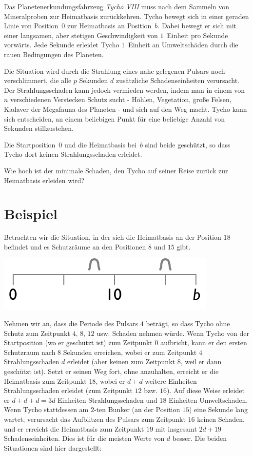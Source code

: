 

\noindent
Das Planetenerkundungsfahrzeug \emph{Tycho VIII} muss nach dem Sammeln von Mineralproben zur Heimatbasis zurückkehren.
Tycho bewegt sich in einer geraden Linie von Position~$0$ zur Heimatbasis an Position~$b$.
Dabei bewegt er sich mit einer langsamen, aber stetigen Geschwindigkeit von $1$~Einheit pro Sekunde vorwärts.
Jede Sekunde erleidet Tycho $1$~Einheit an Umweltschäden durch die rauen Bedingungen des Planeten.

Die Situation wird durch die Strahlung eines nahe gelegenen Pulsars noch verschlimmert, die alle $p$ Sekunden $d$ zusätzliche Schadenseinheiten verursacht.
Der Strahlungsschaden kann jedoch vermieden werden, indem man in einem von $n$ verschiedenen Verstecken Schutz sucht - Höhlen, Vegetation, große Felsen, Kadaver der Megafauna des Planeten - und sich auf den Weg macht.
Tycho kann sich entscheiden, an einem beliebigen Punkt für eine beliebige Anzahl von Sekunden stillzustehen.

Die Startposition~$0$ und die Heimatbasis bei~$b$ sind beide geschützt, so dass Tycho dort keinen Strahlungsschaden erleidet.

\medskip
Wie hoch ist der minimale Schaden, den Tycho auf seiner Reise zurück zur Heimatbasis erleiden wird?

\section*{Beispiel}

Betrachten wir die Situation, in der sich die Heimatbasis an der Position $18$ befindet und es Schutzräume an den Positionen $8$ und $15$ gibt.

\includegraphics[width=.3\textwidth]{img/samplesetup}

Nehmen wir an, dass die Periode des Pulsars $4$ beträgt, so dass Tycho ohne Schutz zum Zeitpunkt $4$, $8$, $12$ usw. Schaden nehmen würde.
Wenn Tycho von der Startposition (wo er geschützt ist) zum Zeitpunkt $0$ aufbricht, kann er den ersten Schutzraum nach $8$ Sekunden erreichen, wobei er zum Zeitpunkt $4$ Strahlungsschaden $d$ erleidet (aber keinen zum Zeitpunkt $8$, weil er dann geschützt ist).
Setzt er seinen Weg fort, ohne anzuhalten, erreicht er die Heimatbasis zum Zeitpunkt $18$, wobei er $d+d$ weitere Einheiten Strahlungsschaden erleidet (zum Zeitpunkt $12$ bzw. $16$).
Auf diese Weise erleidet er $d+d+d=3d$ Einheiten Strahlungsschaden und $18$ Einheiten Umweltschaden.
Wenn Tycho stattdessen am $2$-ten Bunker (an der Position $15$) eine Sekunde lang wartet, verursacht das Aufblitzen des Pulsars zum Zeitpunkt $16$ keinen Schaden, und er erreicht die Heimatbasis zum Zeitpunkt $19$ mit insgesamt $2d + 19$ Schadenseinheiten.
Dies ist für die meisten Werte von $d$ besser.
Die beiden Situationen sind hier dargestellt:

